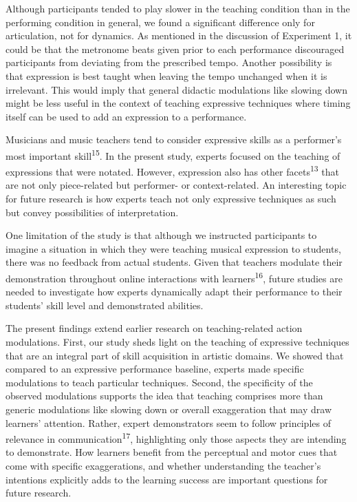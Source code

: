 \documentclass[
  man,floatsintext]{apa6}
\begin{document}
Although participants tended to play slower in the teaching condition than in the performing condition in general, we found a significant difference only for articulation, not for dynamics. As mentioned in the discussion of Experiment 1, it could be that the metronome beats given prior to each performance discouraged participants from deviating from the prescribed tempo. Another possibility is that expression is best taught when leaving the tempo unchanged when it is irrelevant. This would imply that general didactic modulations like slowing down might be less useful in the context of teaching expressive techniques where timing itself can be used to add an expression to a performance.

Musicians and music teachers tend to consider expressive skills as a performer's most important skill\textsuperscript{15}. In the present study, experts focused on the teaching of expressions that were notated. However, expression also has other facets\textsuperscript{13} that are not only piece-related but performer- or context-related. An interesting topic for future research is how experts teach not only expressive techniques as such but convey possibilities of interpretation.

One limitation of the study is that although we instructed participants to imagine a situation in which they were teaching musical expression to students, there was no feedback from actual students. Given that teachers modulate their demonstration throughout online interactions with learners\textsuperscript{16}, future studies are needed to investigate how experts dynamically adapt their performance to their students' skill level and demonstrated abilities.

The present findings extend earlier research on teaching-related action modulations. First, our study sheds light on the teaching of expressive techniques that are an integral part of skill acquisition in artistic domains. We showed that compared to an expressive performance baseline, experts made specific modulations to teach particular techniques. Second, the specificity of the observed modulations supports the idea that teaching comprises more than generic modulations like slowing down or overall exaggeration that may draw learners' attention. Rather, expert demonstrators seem to follow principles of relevance in communication\textsuperscript{17}, highlighting only those aspects they are intending to demonstrate. How learners benefit from the perceptual and motor cues that come with specific exaggerations, and whether understanding the teacher's intentions explicitly adds to the learning success are important questions for future research.
\end{document}
